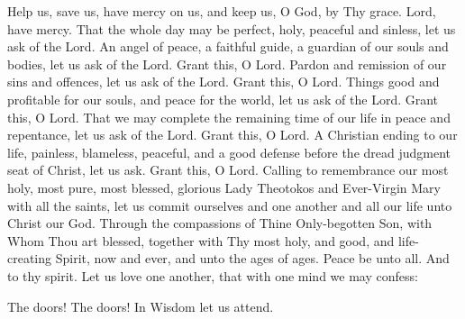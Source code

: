 \begin{liturgicaltext}
    \deacon Help us, save us, have mercy on us, and keep us, O God, by Thy grace.
    \choir Lord, have mercy.
    \deacon That the whole day may be perfect, holy, peaceful and sinless, let us ask of the Lord.
    \choir {}
    \deacon An angel of peace, a faithful guide, a guardian of our souls and bodies, let us ask of the Lord. 
    \choir Grant this, O Lord.
    \deacon Pardon and remission of our sins and offences, let us ask of the Lord.
    \choir Grant this, O Lord.
    \deacon Things good and profitable for our souls, and peace for the world, let us ask of the Lord.
    \choir Grant this, O Lord.
    \deacon That we may complete the remaining time of our life in peace and repentance, let us ask of the Lord.
    \choir Grant this, O Lord.
    \deacon A Christian ending to our life, painless, blameless, peaceful, and a good defense before the dread judgment seat of Christ, let us ask.
    \choir Grant this, O Lord.
    \deacon Calling to remembrance our most holy, most pure, most blessed, glorious Lady Theotokos and Ever-Virgin Mary with all the saints, let us commit ourselves and one another and all our life unto Christ our God.
    \choir {}
    \priest Through the compassions of Thine Only-begotten Son, with Whom Thou art blessed, together with Thy most holy, and good, and life-creating Spirit, now and ever, and unto the ages of ages. 
    \choir {}
    \priest Peace be unto all.
    \choir And to thy spirit.
    \priest Let us love one another, that with one mind we may confess:
    \choir 
\end{liturgicaltext}
\begin{liturgicaltext}
    \deacon The doors! The doors! In Wisdom let us attend. 
\end{liturgicaltext}